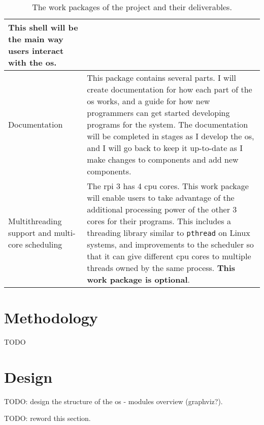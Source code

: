 \documentclass{article}
\begin{document}
\begin{table}[tbp]
\begin{center}
\begin{tabular}{|p{45mm}|p{125mm}|}
    This shell will be the main way users interact with the \gls{os}.
    \\ \hline
    Documentation &
    This package contains several parts. I will create documentation for how
    each part of the \gls{os} works, and a guide for how new programmers can get
    started developing programs for the system. The documentation will be
    completed in stages as I develop the \gls{os}, and I will go back
    to keep it up-to-date as I make changes to components and add new
    components.
    \\ \hline
    Multithreading support and multi-core scheduling &
    The \gls{rpi} 3 has 4 \gls{cpu} cores. This work package will enable users
    to take advantage of the additional processing power of the other 3 cores
    for their programs. This includes a threading library similar to
    \texttt{pthread} on Linux systems, and improvements to the scheduler so
    that it can give different \gls{cpu} cores to multiple threads owned by the
    same process. \textbf{This work package is optional}.
    \\ \hline
\end{tabular}
\caption{The work packages of the project and their deliverables.}
\label{tab:work-packages}
\end{center}
\end{table}




\section{Methodology}
TODO


\section{Design}
TODO: design the structure of the \gls{os} - modules overview (graphviz?).

TODO: reword this section.
\end{document}
